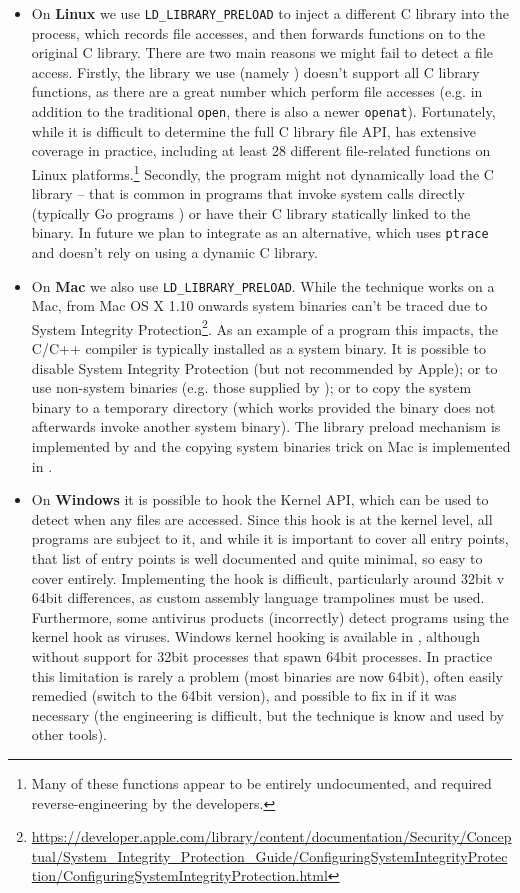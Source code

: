 \begin{itemize}
\item On \textbf{Linux} we use \texttt{LD\_LIBRARY\_PRELOAD} to inject a different C library into the process, which records file accesses, and then forwards functions on to the original C library. There are two main reasons we might fail to detect a file access. Firstly, the library we use (namely \Fsatrace) doesn't support all C library functions, as there are a great number which perform file accesses (e.g. in addition to the traditional \texttt{open}, there is also a newer \texttt{openat}). Fortunately, while it is difficult to determine the full C library file API, \Fsatrace has extensive coverage in practice, including at least 28 different file-related functions on Linux platforms.\footnote{Many of these functions appear to be entirely undocumented, and required reverse-engineering by the \Fsatrace developers.} Secondly, the program might not dynamically load the C library -- that is common in programs that invoke system calls directly (typically Go programs \cite{go}) or have their C library statically linked to the binary. In future we plan to integrate \Bigbro \cite{bigbro} as an alternative, which uses \texttt{ptrace} and doesn't rely on using a dynamic C library.
\item On \textbf{Mac} we also use \texttt{LD\_LIBRARY\_PRELOAD}. While the technique works on a Mac, from Mac OS X 1.10 onwards system binaries can't be traced due to System Integrity Protection\footnote{\url{https://developer.apple.com/library/content/documentation/Security/Conceptual/System_Integrity_Protection_Guide/ConfiguringSystemIntegrityProtection/ConfiguringSystemIntegrityProtection.html}}. As an example of a program this impacts, the C/C++ compiler is typically installed as a system binary. It is possible to disable System Integrity Protection (but not recommended by Apple); or to use non-system binaries (e.g. those supplied by \Nix \cite{nix}); or to copy the system binary to a temporary directory (which works provided the binary does not afterwards invoke another system binary). The library preload mechanism is implemented by \Fsatrace and the copying system binaries trick on Mac is implemented in \Shake.
\item On \textbf{Windows} it is possible to hook the Kernel API, which can be used to detect when any files are accessed. Since this hook is at the kernel level, all programs are subject to it, and while it is important to cover all entry points, that list of entry points is well documented and quite minimal, so easy to cover entirely. Implementing the hook is difficult, particularly around 32bit v 64bit differences, as custom assembly language trampolines must be used. Furthermore, some antivirus products (incorrectly) detect programs using the kernel hook as viruses. Windows kernel hooking is available in  \Fsatrace, although without support for 32bit processes that spawn 64bit processes. In practice this limitation is rarely a problem (most binaries are now 64bit), often easily remedied (switch to the 64bit version), and possible to fix in \Fsatrace if it was necessary (the engineering is difficult, but the technique is know and used by other tools).

\end{itemize}
